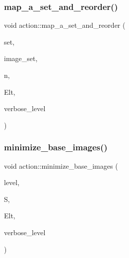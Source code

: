 \subsubsection{\texorpdfstring{map\+\_\+a\+\_\+set\+\_\+and\+\_\+reorder()}{map\_a\_set\_and\_reorder()}}
{\footnotesize\ttfamily void action\+::map\+\_\+a\+\_\+set\+\_\+and\+\_\+reorder (\begin{DoxyParamCaption}\item[{\mbox{\hyperlink{galois_8h_a09fddde158a3a20bd2dcadb609de11dc}{I\+NT}} $\ast$}]{set,  }\item[{\mbox{\hyperlink{galois_8h_a09fddde158a3a20bd2dcadb609de11dc}{I\+NT}} $\ast$}]{image\+\_\+set,  }\item[{\mbox{\hyperlink{galois_8h_a09fddde158a3a20bd2dcadb609de11dc}{I\+NT}}}]{n,  }\item[{\mbox{\hyperlink{galois_8h_a09fddde158a3a20bd2dcadb609de11dc}{I\+NT}} $\ast$}]{Elt,  }\item[{\mbox{\hyperlink{galois_8h_a09fddde158a3a20bd2dcadb609de11dc}{I\+NT}}}]{verbose\+\_\+level }\end{DoxyParamCaption})}

\mbox{\label{classaction_a93d3f510f8678d02b8f246863b542317}} 
\subsubsection{\texorpdfstring{minimize\+\_\+base\+\_\+images()}{minimize\_base\_images()}}
{\footnotesize\ttfamily void action\+::minimize\+\_\+base\+\_\+images (\begin{DoxyParamCaption}\item[{\mbox{\hyperlink{galois_8h_a09fddde158a3a20bd2dcadb609de11dc}{I\+NT}}}]{level,  }\item[{\mbox{\hyperlink{classsims}{sims}} $\ast$}]{S,  }\item[{\mbox{\hyperlink{galois_8h_a09fddde158a3a20bd2dcadb609de11dc}{I\+NT}} $\ast$}]{Elt,  }\item[{\mbox{\hyperlink{galois_8h_a09fddde158a3a20bd2dcadb609de11dc}{I\+NT}}}]{verbose\+\_\+level }\end{DoxyParamCaption})}

\mbox{\label{classaction_ab857fef69d8687a7926a9e4a00dd77ee}} 
